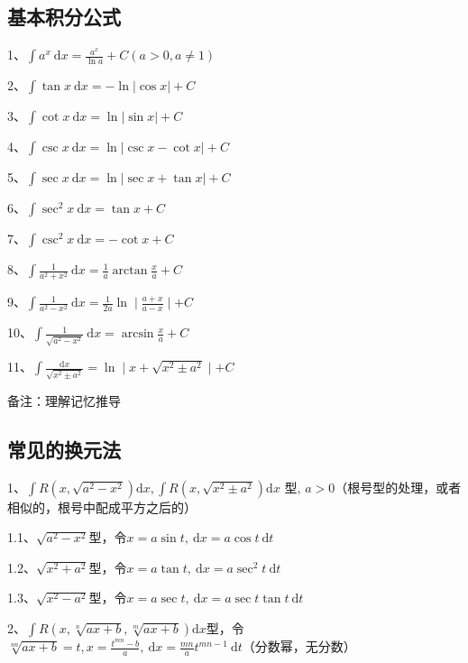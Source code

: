\subsection{基本积分公式}

1、$ \int a^{x} \mathrm{~d} x=\frac{a^{x}}{\ln a}+C(a>0, a \neq 1) $

2、$ \int \tan x \mathrm{~d} x=-\ln |\cos x|+C $

3、$ \int \cot x \mathrm{~d} x=\ln |\sin x|+C $

4、$ \int \csc x \mathrm{~d} x=\ln |\csc x-\cot x|+C $

5、$ \int \sec x \mathrm{~d} x=\ln |\sec x+\tan x|+C $

6、$ \int \sec ^{2} x \mathrm{~d} x=\tan x+C $

7、$ \int \csc ^{2} x \mathrm{~d} x=-\cot x+C $

8、$ \int \frac{1}{a^{2}+x^{2}} \mathrm{~d} x=\frac{1}{a} \arctan \frac{x}{a}+C $

9、$ \int \frac{1}{a^{2}-x^{2}} \mathrm{~d} x=\frac{1}{2 a} \ln \mid \frac{a+x}{a-x} \mid+C $

10、$ \int \frac{1}{\sqrt{a^{2}-x^{2}}} \mathrm{~d} x=\arcsin \frac{x}{a}+C $

11、$ \int \frac{\mathrm{d} x}{\sqrt{x^{2} \pm a^{2}}}=\ln \mid x+\sqrt{x^{2} \pm a^{2}} \mid+ C $

备注：理解记忆推导



\subsection{常见的换元法}

1、$ \int R\left(x, \sqrt{a^{2}-x^{2}}\right) \mathrm{d} x, \int R\left(x, \sqrt{x^{2} \pm a^{2}}\right) \mathrm{d} x \text { 型, } a>0 $（根号型的处理，或者相似的，根号中配成平方之后的）

1.1、$ \sqrt{a^{2}-x^{2}} $型，令$ x=a \sin t, \mathrm{~d} x=a \cos t \mathrm{~d} t $

1.2、$ \sqrt{x^{2}+a^{2}} $型，令$ x=a \tan t, \mathrm{~d} x=a \sec ^{2} t \mathrm{~d} t $

1.3、$ \sqrt{x^{2}-a^{2}} $型，令$ x=a \sec t, \mathrm{~d} x=a \sec t \tan t \mathrm{~d} t $

2、$ \int R(x, \sqrt[n]{a x+b}, \sqrt[m]{a x+b}) \mathrm{d} x $型，令$ \sqrt[n n]{a x+b}=t, x=\frac{t^{m n}-b}{a}, \mathrm{~d} x=\frac{m n}{a} t^{m n-1} \mathrm{~d} t $（分数幂，无分数）

